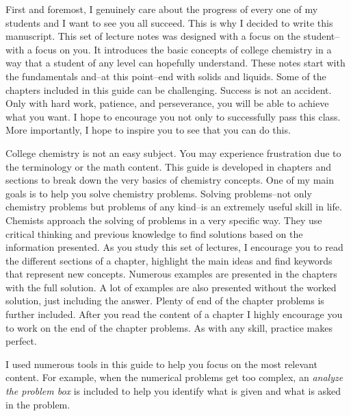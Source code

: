 \documentclass[main.tex]{subfiles}
\begin{document}
\pagestyle{style1}

\begin{fullwidth}
\begin{multicols*}{2}
First and foremost, I genuinely care about the progress of every one of my students and I want to see you all succeed. This is why I decided to write this manuscript. This set of lecture notes was designed with a focus on the student--with a focus on you. It introduces the basic concepts of college chemistry in a way that a student of any level can hopefully understand. These notes start with the fundamentals and--at this point--end with solids and liquids. Some of the chapters included in this guide can be challenging. Success is not an accident. Only with hard work, patience, and perseverance, you will be able to achieve what you want. I hope to encourage you not only to successfully pass this class. More importantly, I hope to inspire you to see that you can do this. 

College chemistry is not an easy subject. You may experience frustration due to the terminology or the math content. This guide is developed in chapters and sections to break down the very basics of chemistry concepts. One of my main goals is to help you solve chemistry problems. Solving problems--not only chemistry problems but problems of any kind--is an extremely useful skill in life. Chemists approach the solving of problems in a very specific way. They use critical thinking and previous knowledge to find solutions based on the information presented. As you study this set of lectures, I encourage you to read the different sections of a chapter, highlight the main ideas and find keywords that represent new concepts. Numerous examples are presented in the chapters with the full solution. A lot of examples are also presented without the worked solution, just including the answer. Plenty of end of the chapter problems is further included. After you read the content of a chapter I highly encourage you to work on the end of the chapter problems. As with any skill, practice makes perfect.

I used numerous tools in this guide to help you focus on the most relevant content. For example, when the numerical problems get too complex, an \emph{analyze the problem box} is included to help you identify what is given and what is asked in the problem.


\end{multicols*}
\end{fullwidth}
\end{document}
